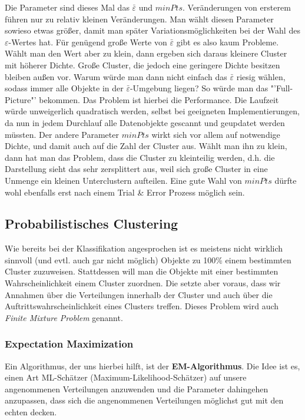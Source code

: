 Die Parameter sind dieses Mal das \(\bar{\varepsilon}\) und \(minPts\).
Veränderungen von ersterem führen nur zu relativ kleinen Veränderungen.
Man wählt diesen Parameter sowieso etwas größer, damit man später
Variationsmöglichkeiten bei der Wahl des \(\varepsilon\)-Wertes hat. Für
genügend große Werte von \(\bar{\varepsilon}\) gibt es also kaum Probleme.
Wählt man den Wert aber zu klein, dann ergeben sich daraus kleinere Cluster
mit höherer Dichte. Große Cluster, die jedoch eine geringere Dichte besitzen
bleiben außen vor. Warum würde man dann nicht einfach das \(\bar{\varepsilon}\)
riesig wählen, sodass immer alle Objekte in der \(\bar{\varepsilon}\)-Umgebung 
liegen? So würde man das "'Full-Picture"' bekommen. Das Problem ist hierbei
die Performance. Die Laufzeit würde unweigerlich quadratisch werden, selbst
bei geeigneten Implementierungen, da nun in jedem Durchlauf alle Datenobjekte
gescannt und geupdatet werden müssten. Der andere Parameter \(minPts\)
wirkt sich vor allem auf notwendige Dichte, und damit auch auf die Zahl der Cluster
aus. Wählt man ihn zu klein, dann hat man das Problem, dass die Cluster zu
kleinteilig werden, d.h. die Darstellung sieht das sehr zersplittert aus, weil sich
große Cluster in eine Unmenge ein kleinen Unterclustern aufteilen. Eine 
gute Wahl von \(minPts\) dürfte wohl ebenfalls erst nach einem Trial \& Error
Prozess möglich sein.

\subsection{Probabilistisches Clustering}
Wie bereits bei der Klassifikation angesprochen ist es meistens nicht wirklich
sinnvoll (und evtl. auch gar nicht möglich) Objekte zu 100\% einem
bestimmten Cluster zuzuweisen. Stattdessen will man die Objekte
mit einer bestimmten Wahrscheinlichkeit einem Cluster zuordnen. Die setzte 
aber voraus, dass wir Annahmen über die Verteilungen innerhalb der Cluster
und auch über die Auftrittswahrscheinlichkeit eines Clusters treffen.
Dieses Problem wird auch \textit{Finite Mixture Problem} genannt.

\subsubsection{Expectation Maximization}
Ein Algorithmus, der uns hierbei hilft, ist der \textbf{EM-Algorithmus}.
Die Idee ist es, einen Art ML-Schätzer (Maximum-Likelihood-Schätzer) auf unsere angenommenen
Verteilungen anzuwenden und die Parameter dahingehen anzupassen,
dass sich die angenommenen Verteilungen möglichst gut mit den echten
decken.

